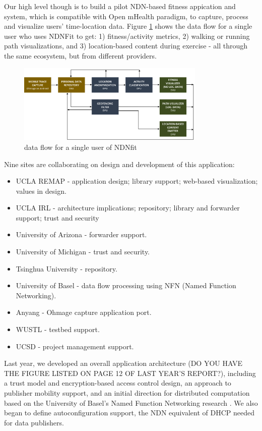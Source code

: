 \documentclass{article}
\begin{document}
Our high level though is to build a pilot NDN-based fitness appication and system, which is compatible with Open mHealth paradigm, to capture, process and visualize users' time-location data. Figure \ref{fig:dataflow} shows the data flow for a single user who uses NDNFit to get: 1) fitness/activity metrics,  2) walking or running path visualizations, and  3) location-based content during exercise - all through the same ecosystem, but from different providers. 

\begin{figure}
	\begin{center}
		\includegraphics[width=0.8\textwidth]{dataflow.png}
		\caption{data flow for a single user of NDNfit}
		\label{fig:dataflow}
	\end{center}
\end{figure}

Nine sites are collaborating on design and development of this application:
\begin{itemize}
	\item UCLA REMAP - application design; library support; web-based visualization; values in design.
	\item UCLA IRL - architecture implications; repository; library and forwarder support; trust and security
	\item University of Arizona - forwarder support.
	\item University of Michigan - trust and security.
	\item Tsinghua University - repository.
	\item University of Basel - data flow processing using NFN (Named Function Networking).
	\item Anyang - Ohmage capture application port.
	\item WUSTL - testbed support.
	\item UCSD - project management support.
\end{itemize}

Last year, we developed an overall application architecture (DO YOU HAVE THE FIGURE LISTED ON PAGE 12 OF LAST YEAR'S REPORT?), including a trust model and encryption-based access control design, an approach to publisher mobility support, and an initial direction for distributed computation based on the University of Basel's Named Function Networking research \cite{tschudinnamed}. We also began to define autoconfiguration support, the NDN equivalent of DHCP needed for data publishers.
\end{document}
